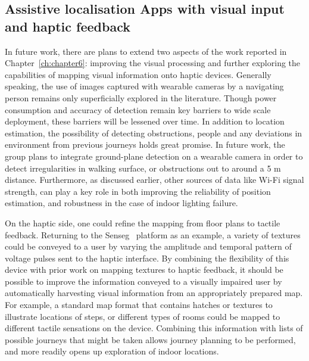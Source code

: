 \subsection{Assistive localisation Apps with visual input and haptic feedback}

In future work, there are plans to extend two aspects of the work reported in Chapter~\ref{ch:chapter6}: improving the visual processing and further exploring the capabilities of mapping visual information onto haptic devices. Generally speaking, the use of images captured with wearable cameras by a navigating person remains only superficially explored in the literature. Though power consumption and accuracy of detection remain key barriers to wide scale deployment, these barriers will be lessened over time. In addition to location estimation, the possibility of detecting obstructions, people and any deviations in environment from previous journeys holds great promise. In future work, the group plans to integrate ground-plane detection on a wearable camera in order to detect irregularities in walking surface, or obstructions out to around a 5 m distance. Furthermore, as discussed earlier, other sources of data like Wi-Fi signal strength, can play a key role in both improving the reliability of position estimation, and robustness in the case of indoor lighting failure.

On the haptic side, one could refine the mapping from floor plans to tactile feedback. Returning to the Senseg\texttrademark~ platform as an example, a variety of textures could be conveyed to a user by varying the amplitude and temporal pattern of voltage pulses sent to the haptic interface. By combining the flexibility of this device with prior work on mapping textures to haptic feedback, it should be possible to improve the information conveyed to a visually impaired user by automatically harvesting visual information from an appropriately prepared map. For example, a standard map format that contains hatches or textures to illustrate locations of steps, or different types of rooms could be mapped to different tactile sensations on the device. Combining this information with lists of possible journeys that might be taken allows journey planning to be performed, and more readily opens up exploration of indoor locations.



